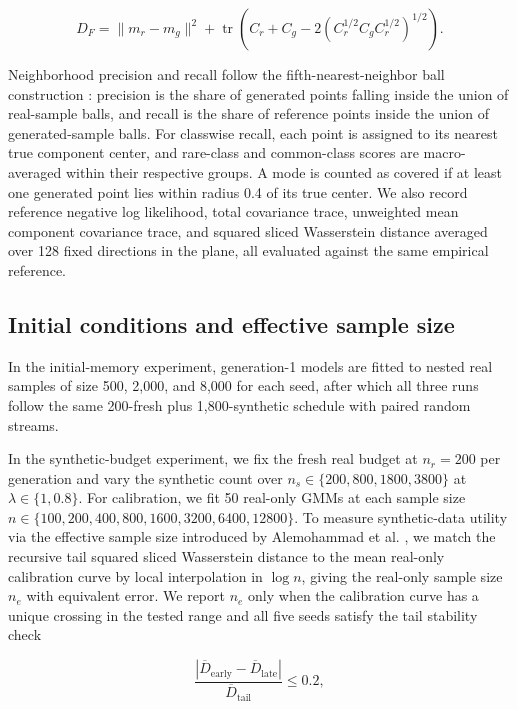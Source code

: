 \documentclass[11pt,a4paper]{article}
\begin{document}
\begin{equation}
D_F=\|m_r-m_g\|^2+\operatorname{tr}\!\left(C_r+C_g-2(C_r^{1/2}C_gC_r^{1/2})^{1/2}\right).
\end{equation}

Neighborhood precision and recall follow the fifth-nearest-neighbor ball construction \cite{r3}: precision is the share of generated points falling inside the union of real-sample balls, and recall is the share of reference points inside the union of generated-sample balls. For classwise recall, each point is assigned to its nearest true component center, and rare-class and common-class scores are macro-averaged within their respective groups. A mode is counted as covered if at least one generated point lies within radius 0.4 of its true center. We also record reference negative log likelihood, total covariance trace, unweighted mean component covariance trace, and squared sliced Wasserstein distance averaged over 128 fixed directions in the plane, all evaluated against the same empirical reference.


\FloatBarrier
\subsection{Initial conditions and effective sample size}

In the initial-memory experiment, generation-1 models are fitted to nested real samples of size 500, 2,000, and 8,000 for each seed, after which all three runs follow the same 200-fresh plus 1,800-synthetic schedule with paired random streams.


In the synthetic-budget experiment, we fix the fresh real budget at $n_r=200$ per generation and vary the synthetic count over $n_s\in\{200,800,1800,3800\}$ at $\lambda\in\{1,0.8\}$. For calibration, we fit 50 real-only GMMs at each sample size $n\in\{100,200,400,800,1600,3200,6400,12800\}$. To measure synthetic-data utility via the effective sample size introduced by Alemohammad et al. \cite{r1}, we match the recursive tail squared sliced Wasserstein distance to the mean real-only calibration curve by local interpolation in $\log n$, giving the real-only sample size $n_e$ with equivalent error. We report $n_e$ only when the calibration curve has a unique crossing in the tested range and all five seeds satisfy the tail stability check


\begin{equation}
\frac{|\overline D_{\mathrm{early}}-\overline D_{\mathrm{late}}|}{\overline D_{\mathrm{tail}}}\le0.2,
\end{equation}
\end{document}

